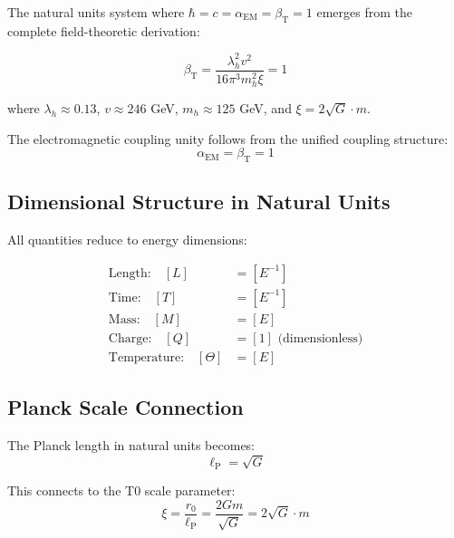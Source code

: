 \documentclass[twocolumn,aps,prl]{revtex4-2}
\newcommand{\lP}{\ell_{\text{P}}}
\begin{document}
	The natural units system where \(\hbar = c = \alpha_{\text{EM}} = \beta_{\text{T}} = 1\) emerges from the complete field-theoretic derivation:
	
	\begin{equation}
		\beta_{\text{T}} = \frac{\lambda_h^2 v^2}{16\pi^3 m_h^2 \xi} = 1
		\label{eq:beta_t_derivation}
	\end{equation}
	
	where \(\lambda_h \approx 0.13\), \(v \approx 246\) GeV, \(m_h \approx 125\) GeV, and \(\xi = 2\sqrt{G} \cdot m\).
	
	The electromagnetic coupling unity follows from the unified coupling structure:
	\begin{equation}
		\alpha_{\text{EM}} = \beta_{\text{T}} = 1
		\label{eq:coupling_unity}
	\end{equation}
	
	\subsection{Dimensional Structure in Natural Units}
	\label{subsec:dimensional_structure}
	
	All quantities reduce to energy dimensions:
	
	\begin{tcolorbox}[colback=blue!5!white,colframe=blue!75!black,title=T0 Natural Units Dimensions]
		\begin{align}
			\text{Length:} \quad [L] &= [E^{-1}] \\
			\text{Time:} \quad [T] &= [E^{-1}] \\
			\text{Mass:} \quad [M] &= [E] \\
			\text{Charge:} \quad [Q] &= [1] \text{ (dimensionless)} \\
			\text{Temperature:} \quad [\Theta] &= [E]
		\end{align}
	\end{tcolorbox}
	
	\subsection{Planck Scale Connection}
	\label{subsec:planck_connection}
	
	The Planck length in natural units becomes:
	\begin{equation}
		\lP = \sqrt{G}
		\label{eq:planck_length_natural}
	\end{equation}
	
	This connects to the T0 scale parameter:
	\begin{equation}
		\xi = \frac{r_0}{\lP} = \frac{2Gm}{\sqrt{G}} = 2\sqrt{G} \cdot m
		\label{eq:xi_definition}
	\end{equation}
	
\end{document}
